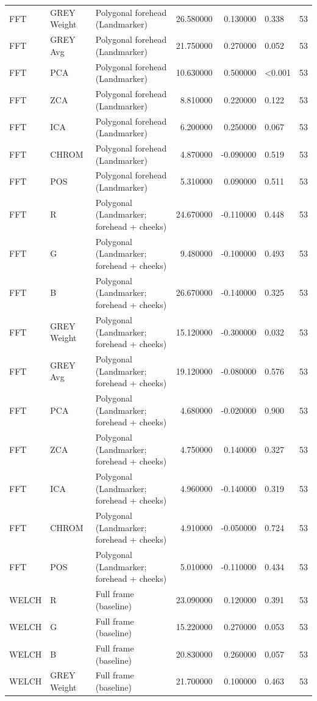 \begin{table}[htbp]
\begin{tabular}{l l l r r l r}
FFT & GREY Weight & Polygonal forehead (Landmarker) & 26.580000 & 0.130000 & 0.338 & 53 \\
FFT & GREY Avg & Polygonal forehead (Landmarker) & 21.750000 & 0.270000 & 0.052 & 53 \\
FFT & PCA & Polygonal forehead (Landmarker) & 10.630000 & 0.500000 & <0.001 & 53 \\
FFT & ZCA & Polygonal forehead (Landmarker) & 8.810000 & 0.220000 & 0.122 & 53 \\
FFT & ICA & Polygonal forehead (Landmarker) & 6.200000 & 0.250000 & 0.067 & 53 \\
FFT & CHROM & Polygonal forehead (Landmarker) & 4.870000 & -0.090000 & 0.519 & 53 \\
FFT & POS & Polygonal forehead (Landmarker) & 5.310000 & 0.090000 & 0.511 & 53 \\
FFT & R & Polygonal (Landmarker; forehead + cheeks) & 24.670000 & -0.110000 & 0.448 & 53 \\
FFT & G & Polygonal (Landmarker; forehead + cheeks) & 9.480000 & -0.100000 & 0.493 & 53 \\
FFT & B & Polygonal (Landmarker; forehead + cheeks) & 26.670000 & -0.140000 & 0.325 & 53 \\
FFT & GREY Weight & Polygonal (Landmarker; forehead + cheeks) & 15.120000 & -0.300000 & 0.032 & 53 \\
FFT & GREY Avg & Polygonal (Landmarker; forehead + cheeks) & 19.120000 & -0.080000 & 0.576 & 53 \\
FFT & PCA & Polygonal (Landmarker; forehead + cheeks) & 4.680000 & -0.020000 & 0.900 & 53 \\
FFT & ZCA & Polygonal (Landmarker; forehead + cheeks) & 4.750000 & 0.140000 & 0.327 & 53 \\
FFT & ICA & Polygonal (Landmarker; forehead + cheeks) & 4.960000 & -0.140000 & 0.319 & 53 \\
FFT & CHROM & Polygonal (Landmarker; forehead + cheeks) & 4.910000 & -0.050000 & 0.724 & 53 \\
FFT & POS & Polygonal (Landmarker; forehead + cheeks) & 5.010000 & -0.110000 & 0.434 & 53 \\
WELCH & R & Full frame (baseline) & 23.090000 & 0.120000 & 0.391 & 53 \\
WELCH & G & Full frame (baseline) & 15.220000 & 0.270000 & 0.053 & 53 \\
WELCH & B & Full frame (baseline) & 20.830000 & 0.260000 & 0.057 & 53 \\
WELCH & GREY Weight & Full frame (baseline) & 21.700000 & 0.100000 & 0.463 & 53 \\

\end{tabular}
\end{table}
